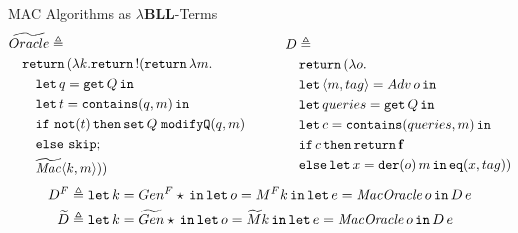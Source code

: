 \documentclass{beamer}[aspectratio=169]
\newcommand{\lamBLL}{{\lambda}\mathbf{BLL}}
\begin{document}
\begin{frame}{MAC Algorithms as \texorpdfstring{$\lamBLL$-Terms}{Lambda-BLL-Terms}}
    \footnotesize{
     \begin{align*}
     \begin{aligned}
        &\widetilde{Oracle} \triangleq \\
        &\quad \mathtt{return}\,(\lambda k.\mathtt{return}\, \mathord{!}(\mathtt{return}\, \lambda m. \\
        &\quad\quad \mathtt{let}\,q=\mathtt{get}\, Q\,\mathtt{in}\, \\
        &\quad\quad \mathtt{let}\,t=\mathtt{contains}(q,m)\,\mathtt{in}\, \\
        &\quad\quad \mathtt{if}\ \mathtt{not}(t)\,\mathtt{then} \,\mathtt{set}\,Q\;\mathtt{modifyQ}(q,m) \\
        &\quad\quad \mathtt{else}\ \mathtt{skip}; \\
        &\quad\quad \mathit{\widetilde{Mac}}\langle k,m \rangle))
    \end{aligned}
    \qquad\quad
    \begin{aligned}
        &D \triangleq \\
        &\quad \mathtt{return}\,(\lambda o. \\
        &\quad \mathtt{let}\,\langle m,tag \rangle = Adv\, o\,\mathtt{in}\, \\
        &\quad \mathtt{let}\,queries = \mathtt{get}\, Q\,\mathtt{in}\, \\
        &\quad \mathtt{let}\,c=\mathtt{contains}(queries, m)\,\mathtt{in}\, \\
        &\quad \mathtt{if}\, c\, \mathtt{then}\, \mathtt{return}\, \mathbf{f} \\
        &\quad \mathtt{else}\,\mathtt{let}\,x=\mathtt{der}(o)\, m\,\mathtt{in}\, \mathtt{eq}(x,tag))
    \end{aligned}
    \end{align*}
    \begin{align*}
        D^F &\triangleq \mathtt{let}\,k=Gen^F \star\,\mathtt{in}\, \mathtt{let}\,o=M^F k\,\mathtt{in}\, \mathtt{let}\,e=\mathit{MacOracle}\,o\,\mathtt{in}\, D\,e \\  
        \widetilde{D} &\triangleq \mathtt{let}\,k=\widetilde{Gen} \star\,\mathtt{in}\, \mathtt{let}\,o=\widetilde{M} k\,\mathtt{in}\, \mathtt{let}\,e=\mathit{MacOracle}\,o\,\mathtt{in}\, D\,e \label{eq:d-tilde}
    \end{align*}
    }
\end{frame}
\end{document}
